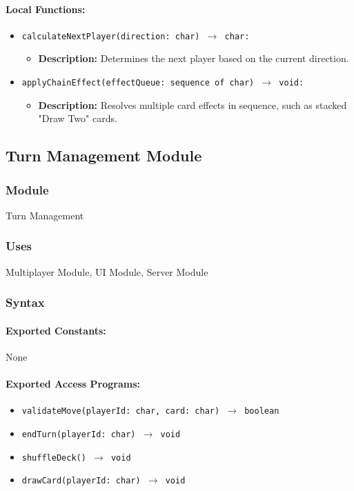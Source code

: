 \documentclass[12pt, titlepage]{article}
\begin{document}
\paragraph{Local Functions:}
\begin{itemize}
    \item \texttt{calculateNextPlayer(direction: char) $\to$ char:}
    \begin{itemize}
        \item \textbf{Description:} Determines the next player based on the current direction.
    \end{itemize}
    \item \texttt{applyChainEffect(effectQueue: sequence of char) $\to$ void:}
    \begin{itemize}
        \item \textbf{Description:} Resolves multiple card effects in sequence, such as stacked "Draw Two" cards.
    \end{itemize}
\end{itemize}

\newpage

\subsection{Turn Management Module}

\subsubsection{Module}
Turn Management

\subsubsection{Uses}
Multiplayer Module, UI Module, Server Module

\subsubsection{Syntax}

\paragraph{Exported Constants:}
None

\paragraph{Exported Access Programs:}
\begin{itemize}
    \item \texttt{validateMove(playerId: char, card: char) $\to$ boolean}
    \item \texttt{endTurn(playerId: char) $\to$ void}
    \item \texttt{shuffleDeck() $\to$ void}
    \item \texttt{drawCard(playerId: char) $\to$ void}
\end{itemize}
\end{document}
